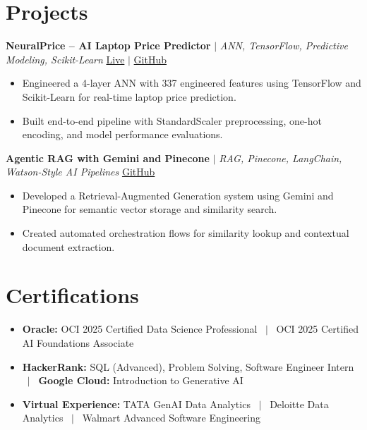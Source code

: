 \documentclass[a4paper,9pt]{article}
\newcommand{\resumeItem}[1]{\item\small #1}
\begin{document}
\vspace{-2mm}

\section{Projects}

\noindent\textbf{NeuralPrice -- AI Laptop Price Predictor} $|$ \textit{ANN, TensorFlow, Predictive Modeling, Scikit-Learn} \hfill
\href{https://huggingface.co/spaces/Harsh0809/laptop-price-predictor-Ann}{\small Live} $|$
\href{https://github.com/hsachan295-source/Laptop-Price-Prediction-ANN}{\small GitHub}
\begin{itemize}
\resumeItem{Engineered a 4-layer ANN with 337 engineered features using TensorFlow and Scikit-Learn for real-time laptop price prediction.}
\resumeItem{Built end-to-end pipeline with StandardScaler preprocessing, one-hot encoding, and model performance evaluations.}
\end{itemize}

\vspace{1.5pt}
\noindent\textbf{Agentic RAG with Gemini and Pinecone} $|$ \textit{RAG, Pinecone, LangChain, Watson-Style AI Pipelines} \hfill
\href{https://github.com/hsachan295-source/Agentic-RAG-with-Gemini-and-Pinecone}{\small GitHub}
\begin{itemize}
\resumeItem{Developed a Retrieval-Augmented Generation system using Gemini and Pinecone for semantic vector storage and similarity search.}
\resumeItem{Created automated orchestration flows for similarity lookup and contextual document extraction.}
\end{itemize}


\vspace{-2mm}

\section{Certifications}
\begin{itemize}
\resumeItem{\textbf{Oracle:} OCI 2025 Certified Data Science Professional ~$|$~ OCI 2025 Certified AI Foundations Associate}
\resumeItem{\textbf{HackerRank:} SQL (Advanced), Problem Solving, Software Engineer Intern ~$|$~ \textbf{Google Cloud:} Introduction to Generative AI}
\resumeItem{\textbf{Virtual Experience:} TATA GenAI Data Analytics ~$|$~ Deloitte Data Analytics ~$|$~ Walmart Advanced Software Engineering}
\end{itemize}

\vspace{-2mm}
\end{document}
